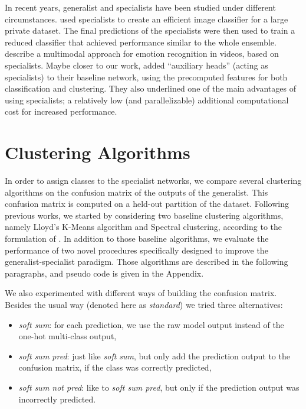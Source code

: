 \documentclass[12pt]{article}
\begin{document}
In recent years, generalist and specialists have been studied under
different circumstances. \cite{darkknowledge} used specialists to create
an efficient image classifier for a large private dataset. The final
predictions of the specialists were then used to train a reduced
classifier that achieved performance similar to the whole ensemble.
\cite{emonets} describe a multimodal approach for emotion recognition in
videos, based on specialists. Maybe closer to our work,
\cite{wardefarley} added ``auxiliary heads'' (acting as specialists) to
their baseline network, using the precomputed features for both
classification and clustering. They also underlined one of the main
advantages of using specialists; a relatively low (and parallelizable)
additional computational cost for increased performance.

\section{Clustering Algorithms}\label{clustering-algorithms}

In order to assign classes to the specialist networks, we compare
several clustering algorithms on the confusion matrix of the outputs of
the generalist. This confusion matrix is computed on a held-out
partition of the dataset. Following previous works, we started by
considering two baseline clustering algorithms, namely Lloyd's K-Means
algorithm and Spectral clustering, according to the formulation of
\cite{spectral}. In addition to those baseline algorithms, we evaluate
the performance of two novel procedures specifically designed to improve
the generalist-specialist paradigm. Those algorithms are described in
the following paragraphs, and pseudo code is given in the Appendix.

We also experimented with different ways of building the confusion
matrix. Besides the usual way (denoted here as \emph{standard}) we tried
three alternatives:

\begin{itemize}
\itemsep1pt\parskip0pt
\item
  \emph{soft sum}: for each prediction, we use the raw model output
  instead of the one-hot multi-class output,
\item
  \emph{soft sum pred}: just like \emph{soft sum}, but only add the
  prediction output to the confusion matrix, if the class was correctly
  predicted,
\item
  \emph{soft sum not pred}: like to \emph{soft sum pred}, but only if
  the prediction output was incorrectly predicted.
\end{itemize}
\end{document}
